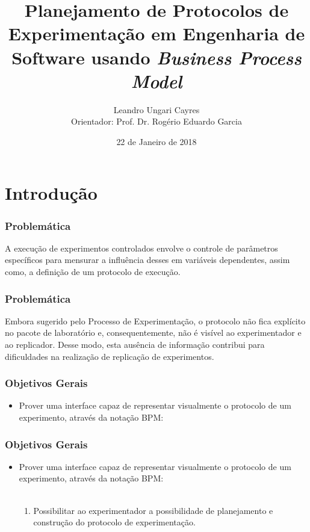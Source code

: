 \documentclass[aspectratio=169]{beamer}
\title[Protocolos de Experimentação]{Planejamento de Protocolos de Experimentação em Engenharia
de Software usando \textit{Business Process Model}}
\author[Leandro Ungari Cayres]{Leandro Ungari Cayres \\Orientador: Prof. Dr. Rogério Eduardo Garcia} %
\institute[UNESP] %
{
Universidade Estadual Paulista \\ %
\medskip
\textit{leandroungari@gmail.com} %
}
\date{22 de Janeiro de 2018} %
\begin{document}
\begin{frame}
\titlepage %
\end{frame}


\section{Introdução}

\begin{frame}
\frametitle{Problemática}
\justifying

A execução de experimentos controlados envolve o controle de parâmetros específicos para mensurar a influência desses em variáveis dependentes, assim como, a definição de um protocolo de execução.

\end{frame}

\begin{frame}
\frametitle{Problemática}
\justifying

Embora sugerido pelo Processo de Experimentação, o protocolo não fica explícito no pacote de laboratório e, consequentemente, não é visível ao experimentador e ao replicador. Desse modo, esta ausência de informação contribui para dificuldades na realização de replicação de experimentos.

\end{frame}


\begin{frame}
\frametitle{Objetivos Gerais}
\justifying

\begin{itemize}
\item Prover uma interface capaz de representar visualmente o protocolo de um experimento, através da notação BPM:
\end{itemize}
\end{frame}

\begin{frame}
\frametitle{Objetivos Gerais}
\justifying

\begin{itemize}
\item Prover uma interface capaz de representar visualmente o protocolo de um experimento, através da notação BPM:
\\~\\
\begin{enumerate}
\item Possibilitar ao experimentador a possibilidade de planejamento e construção do protocolo de experimentação.
\end{enumerate}
\end{itemize}
\end{frame}
\end{document}
